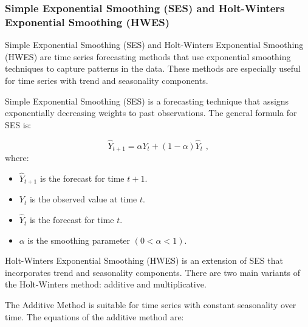 \subsubsection{Simple Exponential Smoothing (SES) and Holt-Winters Exponential Smoothing (HWES)}

Simple Exponential Smoothing (SES) and Holt-Winters Exponential Smoothing (HWES) are time series forecasting methods that use exponential smoothing techniques to capture patterns in the data. These methods are especially useful for time series with trend and seasonality components.
\vspace{10pt}

Simple Exponential Smoothing (SES) is a forecasting technique that assigns exponentially decreasing weights to past observations. The general formula for SES is:

\begin{equation}
\hat{Y}_{t+1} = \alpha Y_t + (1-\alpha) \hat{Y}_t \text{ ,}
\end{equation}where:
\begin{itemize}
    \item \( \hat{Y}_{t+1} \) is the forecast for time \( t+1 \).
    \item \( Y_t \) is the observed value at time \( t \).
    \item \( \hat{Y}_t \) is the forecast for time \( t \).
    \item \( \alpha \) is the smoothing parameter \( (0 < \alpha < 1) \).
\end{itemize}

Holt-Winters Exponential Smoothing (HWES) is an extension of SES that incorporates trend and seasonality components. There are two main variants of the Holt-Winters method: additive and multiplicative.

The Additive Method is suitable for time series with constant seasonality over time. The equations of the additive method are:

